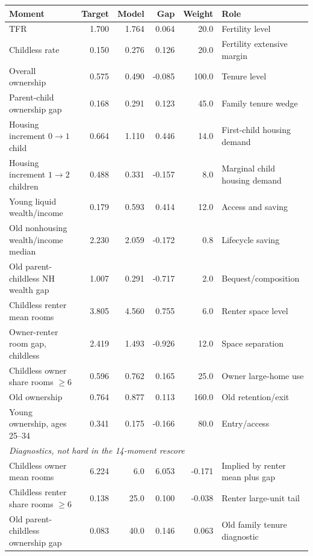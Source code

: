 \documentclass[10pt]{article}
\begin{document}
\begin{center}
\scriptsize
\begin{tabular}{p{2.65in}rrrrp{1.55in}}
\toprule
Moment & Target & Model & Gap & Weight & Role \\
\midrule
TFR & 1.700 & 1.764 & 0.064 & 20.0 & Fertility level \\
Childless rate & 0.150 & 0.276 & 0.126 & 20.0 & Fertility extensive margin \\
Overall ownership & 0.575 & 0.490 & -0.085 & 100.0 & Tenure level \\
Parent-child ownership gap & 0.168 & 0.291 & 0.123 & 45.0 & Family tenure wedge \\
Housing increment \(0\to1\) child & 0.664 & 1.110 & 0.446 & 14.0 & First-child housing demand \\
Housing increment \(1\to2\) children & 0.488 & 0.331 & -0.157 & 8.0 & Marginal child housing demand \\
Young liquid wealth/income & 0.179 & 0.593 & 0.414 & 12.0 & Access and saving \\
Old nonhousing wealth/income median & 2.230 & 2.059 & -0.172 & 0.8 & Lifecycle saving \\
Old parent-childless NH wealth gap & 1.007 & 0.291 & -0.717 & 2.0 & Bequest/composition \\
Childless renter mean rooms & 3.805 & 4.560 & 0.755 & 6.0 & Renter space level \\
Owner-renter room gap, childless & 2.419 & 1.493 & -0.926 & 12.0 & Space separation \\
Childless owner share rooms \(\ge 6\) & 0.596 & 0.762 & 0.165 & 25.0 & Owner large-home use \\
Old ownership & 0.764 & 0.877 & 0.113 & 160.0 & Old retention/exit \\
Young ownership, ages 25--34 & 0.341 & 0.175 & -0.166 & 80.0 & Entry/access \\
\midrule
\multicolumn{6}{l}{\textit{Diagnostics, not hard in the 14-moment rescore}}\\
Childless owner mean rooms & 6.224 & 6.0 & 6.053 & -0.171 & Implied by renter mean plus gap \\
Childless renter share rooms \(\ge 6\) & 0.138 & 25.0 & 0.100 & -0.038 & Renter large-unit tail \\
Old parent-childless ownership gap & 0.083 & 40.0 & 0.146 & 0.063 & Old family tenure diagnostic \\
\bottomrule
\end{tabular}
\end{center}
\end{document}
